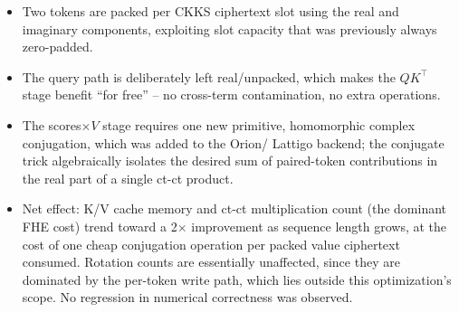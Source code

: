 \documentclass[11pt]{article}
\begin{document}
\begin{itemize}
  \item Two tokens are packed per CKKS ciphertext slot using the real and
        imaginary components, exploiting slot capacity that was previously
        always zero-padded.
  \item The query path is deliberately left real/unpacked, which makes the
        $QK^\top$ stage benefit ``for free'' -- no cross-term contamination,
        no extra operations.
  \item The scores$\times V$ stage requires one new primitive,
        homomorphic complex conjugation, which was added to the Orion/
        Lattigo backend; the conjugate trick algebraically isolates the
        desired sum of paired-token contributions in the real part of a
        single ct-ct product.
  \item Net effect: K/V cache memory and ct-ct multiplication count (the
        dominant FHE cost) trend toward a 2$\times$ improvement as sequence
        length grows, at the cost of one cheap conjugation operation per
        packed value ciphertext consumed. Rotation counts are essentially
        unaffected, since they are dominated by the per-token write path,
        which lies outside this optimization's scope. No regression in
        numerical correctness was observed.
\end{itemize}
\end{document}
